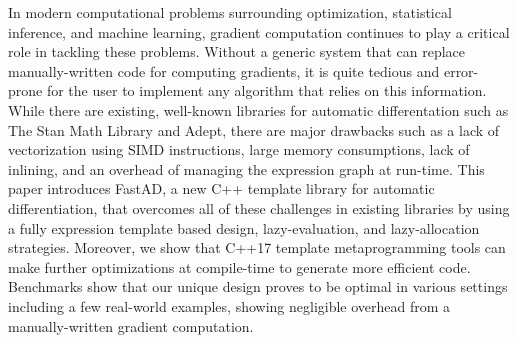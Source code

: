 In modern computational problems surrounding optimization, statistical inference, and machine learning,
gradient computation continues to play a critical role in tackling these problems.
Without a generic system that can replace manually-written code for computing gradients,
it is quite tedious and error-prone for the user to implement any algorithm that relies on this information.
While there are existing, well-known libraries for automatic differentation such as The Stan Math Library
and Adept, there are major drawbacks such as 
a lack of vectorization using SIMD instructions, 
large memory consumptions,
lack of inlining, 
and an overhead of managing the expression graph at run-time.
This paper introduces FastAD, a new C++ template library for automatic differentiation,
that overcomes all of these challenges in existing libraries by using
a fully expression template based design,
lazy-evaluation,
and lazy-allocation strategies.
Moreover, we show that C++17 template metaprogramming tools can 
make further optimizations at compile-time to generate more efficient code.
Benchmarks show that our unique design proves to be optimal in various settings
including a few real-world examples,
showing negligible overhead from a manually-written gradient computation.
